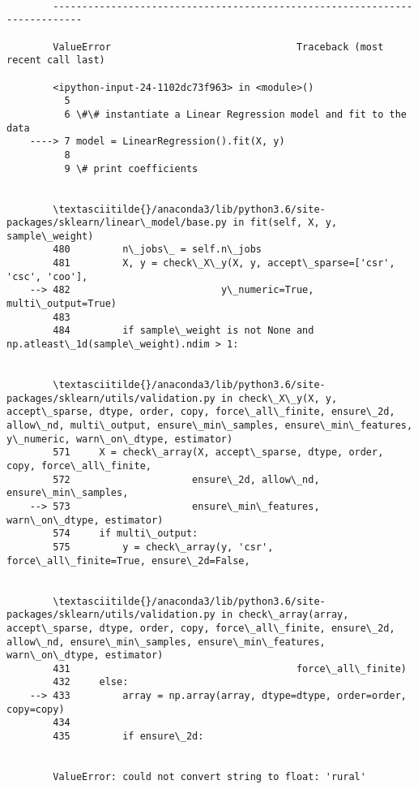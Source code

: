 \documentclass[11pt]{article}
\begin{document}
    \begin{Verbatim}[commandchars=\\\{\}]

        ---------------------------------------------------------------------------

        ValueError                                Traceback (most recent call last)

        <ipython-input-24-1102dc73f963> in <module>()
          5 
          6 \#\# instantiate a Linear Regression model and fit to the data
    ----> 7 model = LinearRegression().fit(X, y)
          8 
          9 \# print coefficients


        \textasciitilde{}/anaconda3/lib/python3.6/site-packages/sklearn/linear\_model/base.py in fit(self, X, y, sample\_weight)
        480         n\_jobs\_ = self.n\_jobs
        481         X, y = check\_X\_y(X, y, accept\_sparse=['csr', 'csc', 'coo'],
    --> 482                          y\_numeric=True, multi\_output=True)
        483 
        484         if sample\_weight is not None and np.atleast\_1d(sample\_weight).ndim > 1:


        \textasciitilde{}/anaconda3/lib/python3.6/site-packages/sklearn/utils/validation.py in check\_X\_y(X, y, accept\_sparse, dtype, order, copy, force\_all\_finite, ensure\_2d, allow\_nd, multi\_output, ensure\_min\_samples, ensure\_min\_features, y\_numeric, warn\_on\_dtype, estimator)
        571     X = check\_array(X, accept\_sparse, dtype, order, copy, force\_all\_finite,
        572                     ensure\_2d, allow\_nd, ensure\_min\_samples,
    --> 573                     ensure\_min\_features, warn\_on\_dtype, estimator)
        574     if multi\_output:
        575         y = check\_array(y, 'csr', force\_all\_finite=True, ensure\_2d=False,


        \textasciitilde{}/anaconda3/lib/python3.6/site-packages/sklearn/utils/validation.py in check\_array(array, accept\_sparse, dtype, order, copy, force\_all\_finite, ensure\_2d, allow\_nd, ensure\_min\_samples, ensure\_min\_features, warn\_on\_dtype, estimator)
        431                                       force\_all\_finite)
        432     else:
    --> 433         array = np.array(array, dtype=dtype, order=order, copy=copy)
        434 
        435         if ensure\_2d:


        ValueError: could not convert string to float: 'rural'

    \end{Verbatim}
\end{document}
